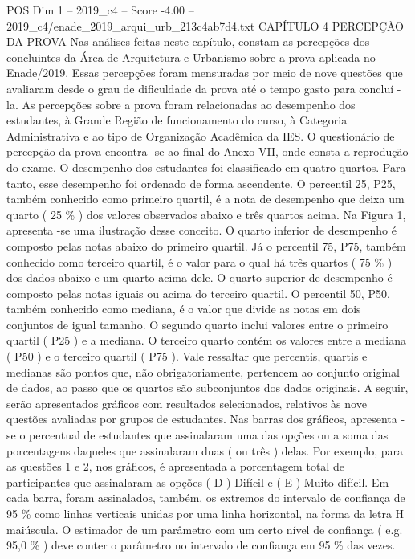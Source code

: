 \begin{textsample}{POS Dim 1 – 2019\_c4 – Score -4.00 – 2019\_c4/enade\_2019\_arqui\_urb\_213c4ab7d4.txt}  \label{ex:f1_pos_344}
CAPÍTULO 4 PERCEPÇÃO DA PROVA Nas análises feitas neste capítulo, constam as percepções dos concluintes da Área de Arquitetura e Urbanismo sobre a prova aplicada no Enade/2019.
Essas percepções foram mensuradas por meio de nove questões que avaliaram desde o grau de dificuldade da prova até o tempo gasto para concluí -la.
As percepções sobre a prova foram relacionadas ao desempenho dos estudantes, à Grande Região de funcionamento do curso, à Categoria Administrativa e ao tipo de Organização Acadêmica da IES.
O questionário de percepção da prova encontra -se ao final do Anexo VII, onde consta a reprodução do exame.
O desempenho dos estudantes foi classificado em quatro quartos.
Para tanto, esse desempenho foi ordenado de forma ascendente.
O percentil 25, P25, também conhecido como primeiro quartil, é a nota de desempenho que deixa um quarto ( 25 \% ) dos valores observados abaixo e três quartos acima.
Na Figura 1, apresenta -se uma ilustração desse conceito.
O quarto inferior de desempenho é composto pelas notas abaixo do primeiro quartil.
Já o percentil 75, P75, também conhecido como terceiro quartil, é o valor para o qual há três quartos ( 75 \% ) dos dados abaixo e um quarto acima dele.
O quarto superior de desempenho é composto pelas notas iguais ou acima do terceiro quartil.
O percentil 50, P50, também conhecido como mediana, é o valor que divide as notas em dois conjuntos de igual tamanho.
O segundo quarto inclui valores entre o primeiro quartil ( P25 ) e a mediana.
O terceiro quarto contém os valores entre a mediana ( P50 ) e o terceiro quartil ( P75 ).
Vale ressaltar que percentis, quartis e medianas são pontos que, não obrigatoriamente, pertencem ao conjunto original de dados, ao passo que os quartos são subconjuntos dos dados originais.
A seguir, serão apresentados gráficos com resultados selecionados, relativos às nove questões avaliadas por grupos de estudantes.
Nas barras dos gráficos, apresenta -se o percentual de estudantes que assinalaram uma das opções ou a soma das porcentagens daqueles que assinalaram duas ( ou três ) delas.
Por exemplo, para as questões 1 e 2, nos gráficos, é apresentada a porcentagem total de participantes que assinalaram as opções ( D ) Difícil e ( E ) Muito difícil.
Em cada barra, foram assinalados, também, os extremos do intervalo de confiança de 95 \% como linhas verticais unidas por uma linha horizontal, na forma da letra H maiúscula.
O estimador de um parâmetro com um certo nível de confiança ( e.g. 95,0 \% ) deve conter o parâmetro no intervalo de confiança em 95 \% das vezes.

\end{textsample}
